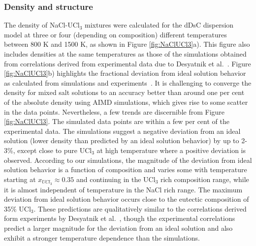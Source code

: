 \documentclass[titlepage=firstiscover,11pt,fleqn,headheight=14pt,footheight=40.8pt]{scrreprt}
\begin{document}
\subsubsection{Density and structure}
The density of NaCl-UCl$_3$ mixtures were calculated for the dDsC dispersion model at three or four (depending on composition) different temperatures between 800 K and 1500 K, as shown in Figure \ref{fig:NaClUCl3}a). This figure also includes densities at the same temperatures as those of the simulations obtained from correlations derived from experimental data due to Desyatnik et al.~\cite{Desyatnik}. %
Figure \ref{fig:NaClUCl3}b) highlights the fractional deviation from ideal solution behavior as calculated from simulations and experiments~\cite{Desyatnik}. 
It is challenging to converge the density for mixed salt solutions to an accuracy better than around one per cent of the absolute density using AIMD simulations, which gives rise to some scatter in the data points. 
Nevertheless, a few trends are discernible from Figure \ref{fig:NaClUCl3}. The simulated data points are within a few per cent of the experimental data.  %
The simulations suggest a negative deviation from an ideal solution (lower density than predicted by an ideal solution behavior) by up to 2-3\%, except close to pure UCl$_3$ at high temperature where a positive deviation is observed. According to our simulations, the magnitude of the deviation from ideal solution behavior is a function of composition and varies some with temperature starting at $x_{UCl_3}\approx0.35$ and continuing in the UCl$_3$ rich composition range, while it is almost independent of temperature in the NaCl rich range. 
The maximum deviation from ideal solution behavior occurs close to the eutectic composition of 35\% UCl$_3$. These predictions are qualitatively similar to the correlations derived form experiments by Desyatnik et al.~\cite{Desyatnik}, though the experimental correlations predict a larger magnitude for the deviation from an ideal solution and also exhibit a stronger temperature dependence than the simulations. %
\end{document}
